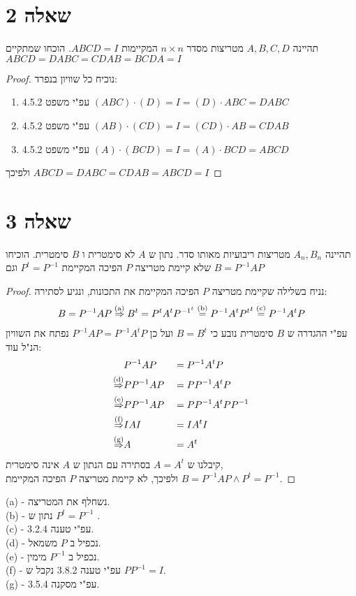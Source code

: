 \documentclass{article}
\begin{document}
	\pagebreak
	\section*{שאלה 2}
	תהיינה $A,B,C,D$ מטריצות מסדר $n\times n$ המקיימות $ABCD = I$.
	הוכחו שמתקיים $ABCD=DABC=CDAB=BCDA=I$
	\begin{proof}
		נוכיח כל שוויון בנפרד:
		\begin{enumerate}
			\item עפ"י משפט 4.5.2 $(ABC)\cdot(D) = I = (D)\cdot ABC = DABC$
			\item עפ"י משפט 4.5.2 $(AB)\cdot(CD) = I = (CD)\cdot AB = CDAB$
			\item עפ"י משפט 4.5.2 $(A)\cdot(BCD) = I = (A)\cdot BCD = ABCD$
		\end{enumerate}
		ולפיכך $ABCD = DABC = CDAB = ABCD = I$
	\end{proof}

	\pagebreak
	\section*{שאלה 3}
תהיינה $A_n,B_n$ מטריצות ריבועיות מאותו סדר. נתון ש $A$ לא סימטרית ו $B$ סימטרית.
הוכיחו שלא קיימת מטריצה $P$ הפיכה המקיימת $P^t = P^{-1}$ וגם $B = P^{-1}AP$

\begin{proof}
	נניח בשלילה שקיימת מטריצה $P$ הפיכה המקיימת את התכונות, ונגיע לסתירה:
	\begin{align*}
		B = P^{-1}AP \overset{\text{(a)}}\Rightarrow
		B^t = P^t A^t P^{{-1}^t} \overset{\text{(b)}}=
		P^{-1} A^t {P^t}^t \overset{\text{(c)}}=
		P^{-1} A^t P
	\end{align*}
	עפ"י ההגדרה ש $B$ סימטרית נובע כי $B = B^t$ ועל כן $P^{-1}A P=P^{-1} A^t P$
	נפתח את השוויון הנ"ל עוד:
	\begin{alignat*}{2}
		&P^{-1}A P &&= P^{-1} A^t P \\
		\overset{\text{(d)}}\Rightarrow
		&P P^{-1}A P &&= P P^{-1} A^t P \\
		\overset{\text{(e)}}\Rightarrow
		&P P^{-1}A P &&= PP^{-1} A^t P P^{-1} \\
		\overset{\text{(f)}}\Rightarrow
		&IAI &&= IA^tI \\
		\overset{\text{(g)}}\Rightarrow
		&A &&= A^t
	\end{alignat*}
	קיבלנו ש $A = A^t$ בסתירה עם הנתון ש $A$ אינה סימטרית, \\
	ולפיכך, לא קיימת מטריצה $P$ הפיכה המקיימת $B = P^{-1}AP \land P^t = P^{-1}$.
\end{proof}
\nl
(a) - נשחלף את המטריצה. \\
(b) - נתון ש $P^t = P^{-1}$ .\\
(c) - עפ"י טענה 3.2.4. \\
(d) - נכפיל ב $P$ משמאל. \\
(e) - נכפיל ב $P^{-1}$ מימין. \\
(f) - עפ"י טענה 3.8.2 נקבל ש $P P^{-1} = I$. \\
(g) - עפ"י מסקנה 3.5.4.
\end{document}
